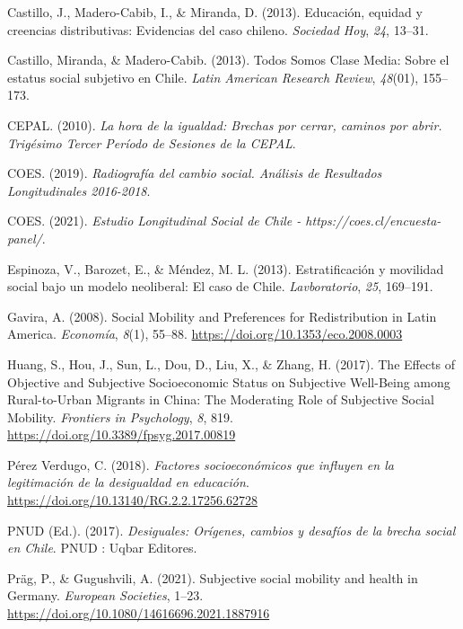 \documentclass[
]{article}
\begin{document}
\leavevmode\hypertarget{ref-castillo_Educacion_2013}{}%
Castillo, J., Madero-Cabib, I., \& Miranda, D. (2013). Educación,
equidad y creencias distributivas: Evidencias del caso chileno.
\emph{Sociedad Hoy}, \emph{24}, 13--31.

\leavevmode\hypertarget{ref-castillo_Todos_2013}{}%
Castillo, Miranda, \& Madero-Cabib. (2013). Todos Somos Clase Media:
Sobre el estatus social subjetivo en Chile. \emph{Latin American
Research Review}, \emph{48}(01), 155--173.

\leavevmode\hypertarget{ref-cepal_hora_2010}{}%
CEPAL. (2010). \emph{La hora de la igualdad: Brechas por cerrar, caminos
por abrir. Trigésimo Tercer Período de Sesiones de la CEPAL}.

\leavevmode\hypertarget{ref-coes_Radiografia_2019}{}%
COES. (2019). \emph{Radiografía del cambio social. Análisis de
Resultados Longitudinales 2016-2018}.

\leavevmode\hypertarget{ref-coes_Estudio_2021}{}%
COES. (2021). \emph{Estudio Longitudinal Social de Chile -
https://coes.cl/encuesta-panel/}.

\leavevmode\hypertarget{ref-espinoza_Estratificacion_2013}{}%
Espinoza, V., Barozet, E., \& Méndez, M. L. (2013). Estratificación y
movilidad social bajo un modelo neoliberal: El caso de Chile.
\emph{Lavboratorio}, \emph{25}, 169--191.

\leavevmode\hypertarget{ref-gavira_Social_2008}{}%
Gavira, A. (2008). Social Mobility and Preferences for Redistribution in
Latin America. \emph{Economía}, \emph{8}(1), 55--88.
\url{https://doi.org/10.1353/eco.2008.0003}

\leavevmode\hypertarget{ref-huang_Effects_2017}{}%
Huang, S., Hou, J., Sun, L., Dou, D., Liu, X., \& Zhang, H. (2017). The
Effects of Objective and Subjective Socioeconomic Status on Subjective
Well-Being among Rural-to-Urban Migrants in China: The Moderating Role
of Subjective Social Mobility. \emph{Frontiers in Psychology}, \emph{8},
819. \url{https://doi.org/10.3389/fpsyg.2017.00819}

\leavevmode\hypertarget{ref-perezverdugo_Factores_2018}{}%
Pérez Verdugo, C. (2018). \emph{Factores socioeconómicos que influyen en
la legitimación de la desigualdad en educación}.
\url{https://doi.org/10.13140/RG.2.2.17256.62728}

\leavevmode\hypertarget{ref-pnud_Desiguales_2017}{}%
PNUD (Ed.). (2017). \emph{Desiguales: Orígenes, cambios y desafíos de la
brecha social en Chile}. PNUD : Uqbar Editores.

\leavevmode\hypertarget{ref-prag_Subjective_2021}{}%
Präg, P., \& Gugushvili, A. (2021). Subjective social mobility and
health in Germany. \emph{European Societies}, 1--23.
\url{https://doi.org/10.1080/14616696.2021.1887916}
\end{document}
